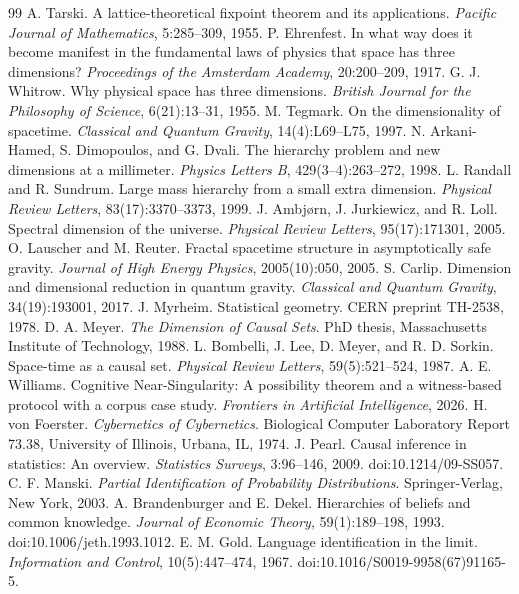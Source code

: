 \documentclass[11pt]{article}
\theoremstyle{definition}
\begin{document}
\begin{thebibliography}{99}
 A. Tarski. A lattice-theoretical fixpoint theorem and its applications. \emph{Pacific Journal of Mathematics}, 5:285--309, 1955.
 P. Ehrenfest. In what way does it become manifest in the fundamental laws of physics that space has three dimensions? \emph{Proceedings of the Amsterdam Academy}, 20:200--209, 1917.
 G. J. Whitrow. Why physical space has three dimensions. \emph{British Journal for the Philosophy of Science}, 6(21):13--31, 1955.
 M. Tegmark. On the dimensionality of spacetime. \emph{Classical and Quantum Gravity}, 14(4):L69--L75, 1997.
 N. Arkani-Hamed, S. Dimopoulos, and G. Dvali. The hierarchy problem and new dimensions at a millimeter. \emph{Physics Letters B}, 429(3--4):263--272, 1998.
 L. Randall and R. Sundrum. Large mass hierarchy from a small extra dimension. \emph{Physical Review Letters}, 83(17):3370--3373, 1999.
 J. Ambj\o rn, J. Jurkiewicz, and R. Loll. Spectral dimension of the universe. \emph{Physical Review Letters}, 95(17):171301, 2005.
 O. Lauscher and M. Reuter. Fractal spacetime structure in asymptotically safe gravity. \emph{Journal of High Energy Physics}, 2005(10):050, 2005.
 S. Carlip. Dimension and dimensional reduction in quantum gravity. \emph{Classical and Quantum Gravity}, 34(19):193001, 2017.
 J. Myrheim. Statistical geometry. CERN preprint TH-2538, 1978.
 D. A. Meyer. \emph{The Dimension of Causal Sets}. PhD thesis, Massachusetts Institute of Technology, 1988.
 L. Bombelli, J. Lee, D. Meyer, and R. D. Sorkin. Space-time as a causal set. \emph{Physical Review Letters}, 59(5):521--524, 1987.
 A. E. Williams. Cognitive Near-Singularity: A possibility theorem and a witness-based protocol with a corpus case study. \emph{Frontiers in Artificial Intelligence}, 2026.
 H. von Foerster. \emph{Cybernetics of Cybernetics}. Biological Computer Laboratory Report 73.38, University of Illinois, Urbana, IL, 1974.
 J. Pearl. Causal inference in statistics: An overview. \emph{Statistics Surveys}, 3:96--146, 2009. doi:10.1214/09-SS057.
 C. F. Manski. \emph{Partial Identification of Probability Distributions}. Springer-Verlag, New York, 2003.
 A. Brandenburger and E. Dekel. Hierarchies of beliefs and common knowledge. \emph{Journal of Economic Theory}, 59(1):189--198, 1993. doi:10.1006/jeth.1993.1012.
 E. M. Gold. Language identification in the limit. \emph{Information and Control}, 10(5):447--474, 1967. doi:10.1016/S0019-9958(67)91165-5.

\end{thebibliography}
\end{document}
